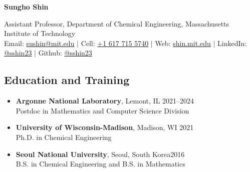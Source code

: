 \documentclass[letterpaper, 11pt]{article}
\begin{document}
\thispagestyle{empty}
\begin{center}
  {\bf\Large Sungho Shin}
\end{center}
\begin{center}
  {Assistant Professor}, Department of Chemical Engineering, {Massachusetts Institute of Technology}\\
  Email: \href{mailto:sushin@mit.edu}{sushin@mit.edu} $|$ Cell: \href{tel:16177155740}{+1 617 715 5740} $|$ Web: \href{https://shin.mit.edu}{shin.mit.edu} $|$ LinkedIn: \href{https://www.linkedin.com/in/sshin23/}{@sshin23} $|$ Github: \href{https://github.com/sshin23}{@sshin23}
\end{center}


\subsection*{Education and Training}
\begin{itemize}[itemsep=1pt, parsep=0pt,leftmargin=*]
\item[]
  {\bf Argonne National Laboratory}, Lemont, IL \hfill 2021--2024\\
  {Postdoc in Mathematics and Computer Science Division}
\item[]
  {\bf University of Wisconsin-Madison}, Madison, WI \hfill 2021\\
  {Ph.D. in Chemical Engineering}
\item[]
  {\bf Seoul National University}, Seoul, South Korea\hfill 2016 \\
  {B.S. in Chemical Engineering} and {B.S. in Mathematics}
\end{itemize}

\end{document}
